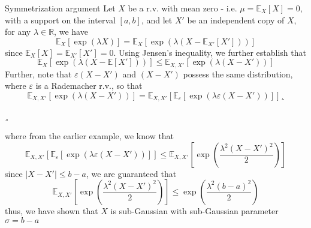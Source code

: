 \documentclass[10pt,handout,english]{beamer}
\newcommand{\E}{\mathbb{E}}
\newcommand{\R}{\mathbb{R}}
\begin{document}
\begin{frame}
\begin{block}{Symmetrization argument}
Let $X$ be a r.v. with mean zero - i.e. $\mu=\E_X[X]=0$, with a support on the interval $[a,b]$, and let $X'$ be an independent copy of $X$, for any $\lambda\in\R$, we have
\[
\E_X[\exp(\lambda X)]=\E_X[\exp(\lambda(X-\E_{X'}[X']))]
\]
since $\E_X[X]=\E_{X'}[X']=0$. Using Jensen's inequality, we further establish that
\[
\E_X[\exp(\lambda(X-\E[X']))]\leq \E_{X,X'}[\exp(\lambda(X-X'))] 
\]
Further, note that $\varepsilon(X-X')$ and $(X-X')$ possess the same distribution, where $\varepsilon$ is a Rademacher r.v., so that
\[
\E_{X,X'}[\exp(\lambda(X-X'))]=\E_{X,X'}[\E_{\varepsilon}[\exp(\lambda\varepsilon(X-X'))]]¸
\]
\end{block}
\end{frame}
\begin{frame}¸
\begin{block}{}
where from the earlier example, we know that
\[
\E_{X,X'}[\E_{\varepsilon}[\exp(\lambda\varepsilon(X-X'))]]\leq \E_{X,X'}\left[\exp\left(\frac{\lambda^2(X-X')^2}{2}\right)\right]
\]
since $\lvert X-X' \rvert\leq b-a$, we are guaranteed that
\[
\E_{X,X'}\left[\exp\left(\frac{\lambda^2(X-X')^2}{2}\right)\right]\leq\exp\left(\frac{\lambda^2(b-a)^2}{2}\right)
\]
thus, we have shown that $X$ is sub-Gaussian with sub-Gaussian parameter $\sigma=b-a$
\end{block}
\end{frame}
\end{document}

